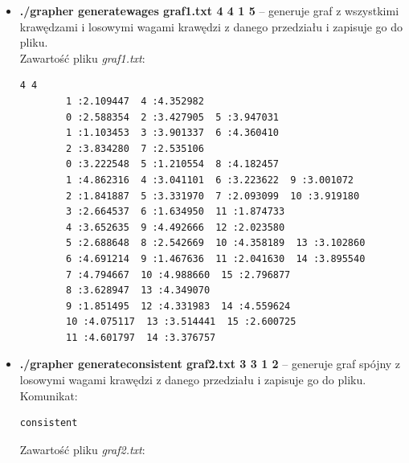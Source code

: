\documentclass{article}
\begin{document}
\begin{itemize}
\newpage
\item \textbf{./grapher generate\textunderscore wages graf1.txt 4 4 1 5} -- generuje graf z wszystkimi krawędzami i losowymi wagami krawędzi z danego przedziału i zapisuje go do pliku.
   \vspace{3mm}
\\
Zawartość pliku \emph{graf1.txt}:
\begin{lstlisting}
4 4
        1 :2.109447  4 :4.352982
        0 :2.588354  2 :3.427905  5 :3.947031
        1 :1.103453  3 :3.901337  6 :4.360410
        2 :3.834280  7 :2.535106
        0 :3.222548  5 :1.210554  8 :4.182457
        1 :4.862316  4 :3.041101  6 :3.223622  9 :3.001072
        2 :1.841887  5 :3.331970  7 :2.093099  10 :3.919180
        3 :2.664537  6 :1.634950  11 :1.874733
        4 :3.652635  9 :4.492666  12 :2.023580
        5 :2.688648  8 :2.542669  10 :4.358189  13 :3.102860
        6 :4.691214  9 :1.467636  11 :2.041630  14 :3.895540
        7 :4.794667  10 :4.988660  15 :2.796877
        8 :3.628947  13 :4.349070
        9 :1.851495  12 :4.331983  14 :4.559624
        10 :4.075117  13 :3.514441  15 :2.600725
        11 :4.601797  14 :3.376757
\end{lstlisting}
\item \textbf{./grapher generate\textunderscore consistent graf2.txt 3 3 1 2} -- generuje graf spójny z losowymi wagami krawędzi z danego przedziału i zapisuje go do pliku. 
   \vspace{3mm}
\\
Komunikat:
\begin{lstlisting}
consistent
\end{lstlisting}

Zawartość pliku \emph{graf2.txt}:


\end{itemize}
\end{document}
